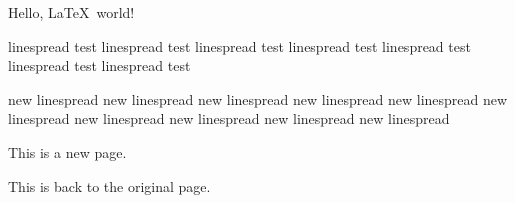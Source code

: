 \documentclass[12pt]{ctexart}
\begin{document}
\setcounter{page}{1}
Hello, \LaTeX\ world!

linespread test linespread test linespread test linespread test linespread test linespread test linespread test

\linespread{1.5}\selectfont
new linespread new linespread new linespread new linespread new linespread new linespread new linespread new linespread new linespread new linespread 

This is a new page.


\restoregeometry
This is back to the original page.
\end{document}
